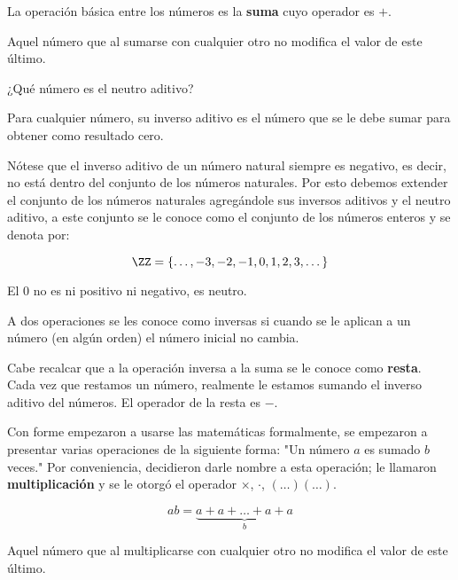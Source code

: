 La operación básica entre los números es la \textbf{suma} 
cuyo operador es $+$.

\begin{definition}
    Aquel número que al sumarse con cualquier otro no modifica 
    el valor de este último.
\end{definition}

\begin{question}
    ¿Qué número es el neutro aditivo?
\end{question}

\begin{definition}
    Para cualquier número, su inverso aditivo es el 
    número que se le debe sumar para obtener como resultado 
    cero.
\end{definition}

Nótese que el inverso aditivo de un número natural siempre es 
negativo, es decir, no está dentro del conjunto de los números 
naturales. Por esto debemos extender el conjunto de los 
números naturales agregándole sus inversos aditivos 
y el neutro aditivo, a este conjunto se le conoce como el conjunto 
de los números enteros y se denota por:

\[\ZZ = \{\dots, -3, -2, -1, 0, 1, 2, 3, \dots\}\]

\begin{moral}
    El $0$ no es ni positivo ni negativo, es neutro.
\end{moral}

\begin{definition}
    A dos operaciones se les conoce como inversas 
    si cuando se le aplican a un número 
    (en algún orden) el número inicial no cambia.
\end{definition}

Cabe recalcar que a la operación inversa a la suma se le conoce 
como \textbf{resta}. Cada vez que restamos un número, realmente le 
estamos sumando el inverso aditivo del números. El operador 
de la resta es $-$.

Con forme empezaron a usarse las matemáticas formalmente, 
se empezaron a presentar varias operaciones de la siguiente forma: 
"Un número $a$ es sumado $b$ veces." Por conveniencia, 
decidieron darle nombre a esta operación; le llamaron 
\textbf{multiplicación} y se le otorgó el operador 
$\times$, $\cdot$, $(\dots)(\dots)$.

\[ab=\underbrace{a+a+\dots+a+a}_{b}\]

\begin{definition}
    Aquel número que al multiplicarse con cualquier otro no 
    modifica el valor de este último.
\end{definition}

